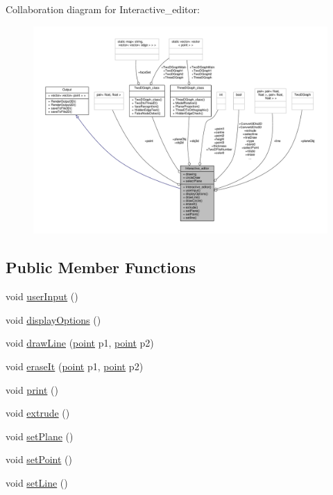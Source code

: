 Collaboration diagram for Interactive\+\_\+editor\+:\nopagebreak
\begin{figure}[H]
\begin{center}
\leavevmode
\includegraphics[width=350pt]{classInteractive__editor__coll__graph}
\end{center}
\end{figure}
\subsection*{Public Member Functions}
\begin{DoxyCompactItemize}
\item 
void \hyperlink{classInteractive__editor_aa7d472e169eed213d1fcb874c6f5a6cd}{user\+Input} ()
\item 
void \hyperlink{classInteractive__editor_a8078ec1404bdd80e09320d14d198f628}{display\+Options} ()
\item 
void \hyperlink{classInteractive__editor_a5a7723f6affebd15ae935eb48e91359f}{draw\+Line} (\hyperlink{structpoint}{point} p1, \hyperlink{structpoint}{point} p2)
\item 
void \hyperlink{classInteractive__editor_a678c382483cb0b40d1616c1d28eaf200}{erase\+It} (\hyperlink{structpoint}{point} p1, \hyperlink{structpoint}{point} p2)
\item 
void \hyperlink{classInteractive__editor_aedd168ce9dc711e3756aafa44146cb76}{print} ()
\item 
void \hyperlink{classInteractive__editor_a6543fe863fa4a902fb4dd71cf6318533}{extrude} ()
\item 
void \hyperlink{classInteractive__editor_a1332966f87d6df07b217ed663105379b}{set\+Plane} ()
\item 
void \hyperlink{classInteractive__editor_a21c3f807f2e892c9b40cae987593e2cb}{set\+Point} ()
\item 
void \hyperlink{classInteractive__editor_a2fd6f0fbf708dc85884fd39628c50c1b}{set\+Line} ()
\end{DoxyCompactItemize}
